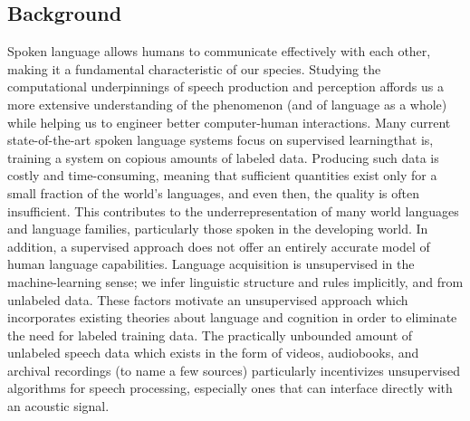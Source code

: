 \documentclass[12pt,letterpaper]{article}
\begin{document}
\subsection{Background}
Spoken language allows humans to communicate effectively with each other, making it a fundamental characteristic of our species. Studying the computational underpinnings of speech production and perception affords us a more extensive understanding of the phenomenon (and of language as a whole) while helping us to engineer better computer-human interactions. Many current state-of-the-art spoken language systems focus on supervised learning\textemdash that is, training a system on copious amounts of labeled data. Producing such data is costly and time-consuming, meaning that sufficient quantities exist only for a small fraction of the world's languages, and even then, the quality is often insufficient. This contributes to the underrepresentation of many world languages and language families, particularly those spoken in the developing world. In addition, a supervised approach does not offer an entirely accurate model of human language capabilities. Language acquisition is unsupervised in the machine-learning sense; we infer linguistic structure and rules implicitly, and from unlabeled data. These factors motivate an unsupervised approach which incorporates existing theories about language and cognition in order to eliminate the need for labeled training data. The practically unbounded amount of unlabeled speech data which exists in the form of videos, audiobooks, and archival recordings (to name a few sources) particularly incentivizes unsupervised algorithms for speech processing, especially ones that can interface directly with an acoustic signal.  
\end{document}
